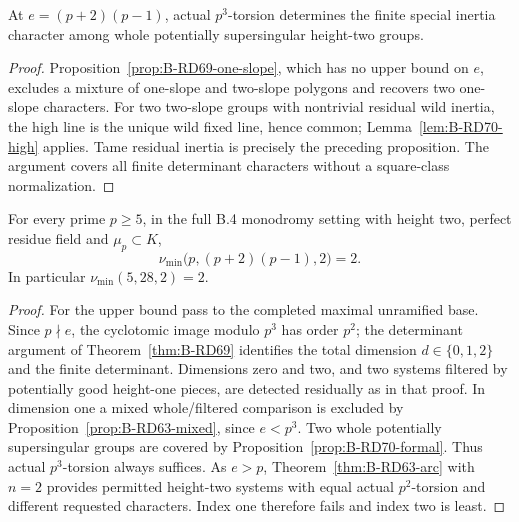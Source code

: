 \begin{proposition}
\label{prop:B-RD70-formal}
At \(e=(p+2)(p-1)\), actual \(p^3\)-torsion determines the
finite special inertia character among whole potentially
supersingular height-two groups.
\end{proposition}
\begin{proof}
Proposition~\ref{prop:B-RD69-one-slope}, which has no upper
bound on \(e\), excludes a mixture of one-slope and two-slope
polygons and recovers two one-slope characters.
For two two-slope groups with nontrivial residual wild inertia,
the high line is the unique wild fixed line, hence common;
Lemma~\ref{lem:B-RD70-high} applies.
Tame residual inertia is precisely the preceding proposition.
The argument covers all finite determinant characters without
a square-class normalization.
\end{proof}

\begin{theorem}
\label{thm:B-RD70}
For every prime \(p\ge5\), in the full B.4 monodromy setting
with height two, perfect residue field and \(\mu_p\subset K\),
\[
 \boxed{\displaystyle
       \nu_{\min}\bigl(p,(p+2)(p-1),2\bigr)=2 .}
 \tag{B-RD70.10}
\]
In particular \(\nu_{\min}(5,28,2)=2\).
\end{theorem}
\begin{proof}
For the upper bound pass to the completed maximal unramified
base. Since \(p\nmid e\), the cyclotomic image modulo \(p^3\)
has order \(p^2\); the determinant argument of
Theorem~\ref{thm:B-RD69} identifies the total dimension
\(d\in\{0,1,2\}\) and the finite determinant.
Dimensions zero and two, and two systems filtered by
potentially good height-one pieces, are detected residually
as in that proof. In dimension one a mixed whole/filtered
comparison is excluded by
Proposition~\ref{prop:B-RD63-mixed}, since \(e<p^3\).
Two whole potentially supersingular groups are covered by
Proposition~\ref{prop:B-RD70-formal}.
Thus actual \(p^3\)-torsion always suffices.
As \(e>p\), Theorem~\ref{thm:B-RD63-arc} with \(n=2\)
provides permitted height-two systems with equal actual
\(p^2\)-torsion and different requested characters.
Index one therefore fails and index two is least.
\end{proof}


